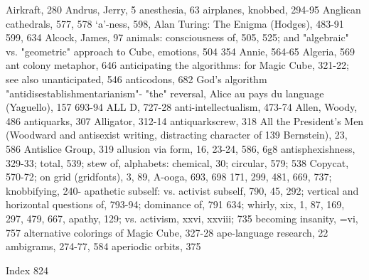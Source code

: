 Airkraft, 280                                     Andrus, Jerry, 5 anesthesia, 63
airplanes, knobbed, 294-95                        Anglican cathedrals, 577, 578 `a'-ness, 598,
Alan Turing: The Enigma (Hodges), 483-91           599, 634
 Alcock, James, 97                                animals: consciousness of, 505, 525; and
"algebraic" vs. "geometric" approach to Cube,     emotions, 504
 354                                              Annie, 564-65
Algeria, 569                                      ant colony metaphor, 646 anticipating the
algorithms: for Magic Cube, 321-22; see also       unanticipated, 546 anticodons, 682
 God's algorithm                                  "antidisestablishmentarianism"- "the" reversal,
Alice au pays du language (Yaguello), 157          693-94
 ALL D, 727-28                                    anti-intellectualism, 473-74
Allen, Woody, 486                                 antiquarks, 307
Alligator, 312-14                                 antiquarkscrew, 318
All the President's Men (Woodward and             antisexist writing, distracting character of 139
 Bernstein), 23, 586                              Antislice Group, 319
allusion via form, 16, 23-24, 586, 6g8            antisphexishness, 329-33; total, 539; stew of,
alphabets: chemical, 30; circular, 579;            538
 Copycat, 570-72; on grid (gridfonts), 3, 89,     A-ooga, 693, 698
 171, 299, 481, 669, 737; knobbifying, 240-       apathetic subself: vs. activist subself, 790,
 45, 292; vertical and horizontal questions of,    793-94; dominance of, 791
 634; whirly, xix, 1, 87, 169, 297, 479, 667,     apathy, 129; vs. activism, xxvi, xxviii;
 735                                               becoming insanity, =vi, 757
alternative colorings of Magic Cube, 327-28       ape-language research, 22
ambigrams, 274-77, 584                            aperiodic orbits, 375

 Index                                                                                       824

